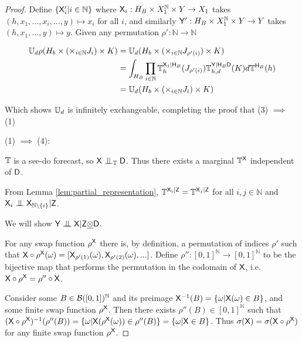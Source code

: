 \begin{proof}
Define $\{\mathsf{X}'_i|i\in \mathbb{N}\}$ where $\mathsf{X}_i:H_B\times X_1^{\mathbb{N}}\times Y\to X_1$ takes $(h,x_1,...,x_i,...,y)\mapsto x_i$ for all $i$, and similarly $\mathsf{Y}':H_B\times X_1^{\mathbb{N}}\times Y\to Y$ takes $(h, x_1,...,y)\mapsto y$. Given any permutation $\rho':\mathbb{N}\to\mathbb{N}$

\begin{align}
    \mathbb{U}_d\rho(H_b \times (\times_{i\in \mathbb{N}}J_{i})\times K)&= \mathbb{U}_d(H_b \times (\times_{i\in \mathbb{N}}J_{\rho'(i)})\times K)\\
    &= \int_{H_B} \prod_{i\in \mathbb{N}} \mathbb{T}^{\mathsf{X}_1|\mathsf{H}_B}_h(J_{\rho'(i)}) \mathbb{T}_{h,d}^{\mathsf{Y}|\mathsf{H}_B\mathsf{D}}(K)d\mathbb{T}^{\mathsf{H}_B}(h)\\
    &= \mathbb{U}_d(H_b \times (\times_{i\in \mathbb{N}}J_{i})\times K)
\end{align}

Which shows $\mathbb{U}_d$ is infinitely exchangeable, completing the proof that (3) $\implies$ (1)


(1) $\implies$ (4):

$\mathbb{T}$ is a see-do forecast, so $\RV{X}\CI_{\kernel{T}}\RV{D}$. Thus there exists a marginal $\mathbb{T}^{\mathsf{X}}$ independent of $\mathsf{D}$.

From Lemma \ref{lem:partial_representation}, $\mathbb{T}^{\mathsf{X}_i|\mathsf{Z}}=\mathbb{T}^{\mathsf{X}_j|\mathsf{Z}}$ for all $i,j\in \mathbb{N}$ and $\RV{X}_i\CI\RV{X}_{\mathbb{N}\setminus\{i\}} |\RV{Z}$.

We will show $\RV{Y}\CI\RV{X}|\RV{Z}\utimes\RV{D}$. 

For any swap function $\rho^{\mathsf{X}}$ there is, by definition, a permutation of indices $\rho'$ such that $\mathsf{X}\circ\rho^{\mathsf{X}}(\omega) = [\mathsf{X}_{\rho'(1)}(\omega),\mathsf{X}_{\rho'(2)}(\omega),...]$. Define $\rho'':[0,1]^{\mathbb{N}}\to[0,1]^{\mathbb{N}}$ to be the bijective map that performs the permutation in the codomain of $\mathsf{X}$, i.e. $\mathsf{X}\circ\rho^{\mathsf{X}} = \rho''\circ\mathsf{X}$.

Consider some $B\in \mathcal{B}([0,1])^\mathbb{N}$ and its preimage $\mathsf{X}^{-1}(B) = \{\omega|\mathsf{X}(\omega)\in B\}$, and some finite swap function $\rho^{\mathsf{X}}$. Then there exists $\rho''(B)\in [0,1]^{\mathbb{N}}$ such that $(\mathsf{X}\circ\rho^{\mathsf{X}})^{-1}(\rho''(B)) = \{\omega|\mathsf{X}(\rho^{\mathsf{X}}(\omega))\in \rho''(B)\} = \{\omega|\mathsf{X}\in B\}$. Thus $\sigma(\mathsf{X})=\sigma(\mathsf{X}\circ\rho^{\mathsf{X}})$ for any finite swap function $\rho^{\mathsf{X}}$.


\end{proof}
